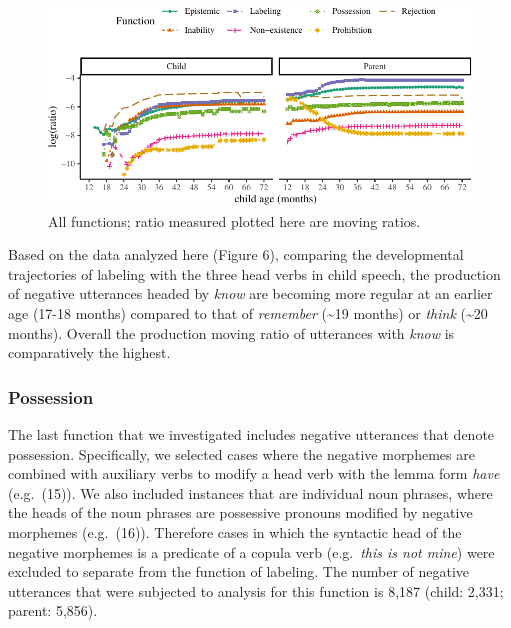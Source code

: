 \documentclass[10pt, letterpaper]{article}
\newenvironment{CodeChunk}{}{}
\begin{document}
\begin{figure}[h!]

\begin{CodeChunk}


\begin{center}\includegraphics{figs/all-1} \end{center}

\end{CodeChunk}

\caption[This image spans both columns]{All functions; ratio measured plotted here are moving ratios.}\label{fig:all}
\end{figure}

Based on the data analyzed here (Figure 6), comparing the developmental
trajectories of labeling with the three head verbs in child speech, the
production of negative utterances headed by \emph{know} are becoming
more regular at an earlier age (17-18 months) compared to that of
\emph{remember} (\textasciitilde19 months) or \emph{think}
(\textasciitilde20 months). Overall the production moving ratio of
utterances with \emph{know} is comparatively the highest.

\hypertarget{possession}{%
\subsubsection{Possession}\label{possession}}

The last function that we investigated includes negative utterances that
denote possession. Specifically, we selected cases where the negative
morphemes are combined with auxiliary verbs to modify a head verb with
the lemma form \emph{have} (e.g.~(15)). We also included instances that
are individual noun phrases, where the heads of the noun phrases are
possessive pronouns modified by negative morphemes (e.g.~(16)).
Therefore cases in which the syntactic head of the negative morphemes is
a predicate of a copula verb (e.g.~\emph{this is not mine}) were
excluded to separate from the function of labeling. The number of
negative utterances that were subjected to analysis for this function is
8,187 (child: 2,331; parent: 5,856).
\end{document}
